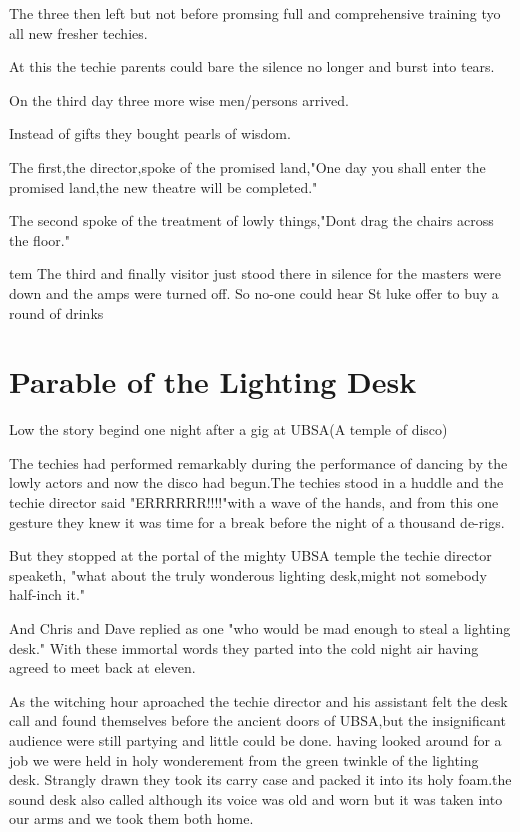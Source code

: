 \documentclass[10pt,a4paper,oneside]{article}
\begin{document}
The three then left but not before promsing full and comprehensive training tyo all new fresher techies. 

At this the techie parents could bare the silence no longer and burst into tears. 

On the third day three more wise men/persons arrived. 

Instead of gifts they bought pearls of wisdom. 

The first,the director,spoke of the promised land,"One day you shall enter the promised land,the new theatre will be completed." 

The second spoke of the treatment of lowly things,"Dont drag the chairs across the floor." 

tem The third and finally visitor just stood there in silence for the masters were down and the amps were turned off. So no-one could hear St luke offer to buy a round of drinks

\section{Parable of the Lighting Desk}
Low the story begind one night after a gig at UBSA(A temple of disco) 

The techies had performed remarkably during the performance of dancing by the lowly actors and now the disco had begun.The techies stood in a huddle and the techie director said "ERRRRRR!!!!"with a wave of the hands, and from this one gesture they knew it was time for a break before the night of a thousand de-rigs. 

But they stopped at the portal of the mighty UBSA temple the techie director speaketh, "what about the truly wonderous lighting desk,might not somebody half-inch it." 

And Chris and Dave replied as one "who would be mad enough to steal a lighting desk." With these immortal words they parted into the cold night air having agreed to meet back at eleven. 

As the witching hour aproached the techie director and his assistant felt the desk call and found themselves before the ancient doors of UBSA,but the insignificant audience were still partying and little could be done. having looked around for a job we were held in holy wonderement from the green twinkle of the lighting desk. Strangly drawn they took its carry case and packed it into its holy foam.the sound desk also called although its voice was old and worn but it was taken into our arms and we took them both home. 
\end{document}
